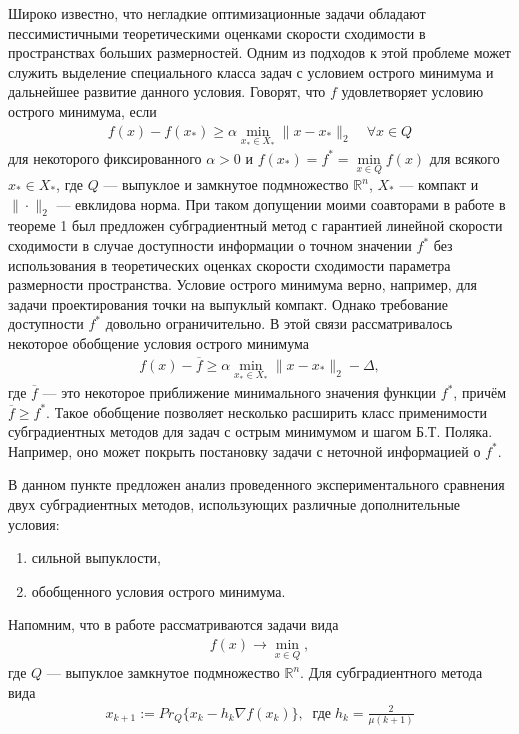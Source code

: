     Широко известно, что негладкие оптимизационные задачи обладают пессимистичными теоретическими оценками скорости сходимости в пространствах больших размерностей. Одним из подходов к этой проблеме может служить выделение специального класса задач с условием острого минимума \cite{6, 1} и дальнейшее развитие данного условия. Говорят, что $f$ удовлетворяет условию острого минимума, если
    \begin{gather}\label{sm}
    f(x) - f(x_*) \geq \alpha \min_{x_* \in X_*} \|x- x_*\|_2 \quad \forall x \in Q
    \end{gather}
    для некоторого фиксированного $\alpha >0$ и $f(x_*) = f^* = \min\limits_{x\in Q} f(x)$ для всякого $x_* \in X_*$, где $Q$ --- выпуклое и замкнутое подмножество $\mathbb{R}^n$, $X_*$ --- компакт и $\|\cdot\|_2$ --- евклидова норма. 
    При таком допущении моими соавторами в работе \cite{sharp22} в теореме 1 был предложен субградиентный метод с гарантией  линейной скорости сходимости в случае доступности информации о точном значении $f^*$ \cite{6} без использования в теоретических оценках скорости сходимости  параметра размерности пространства. Условие острого минимума верно, например, для задачи проектирования точки на выпуклый компакт. Однако требование доступности $f^*$ довольно ограничительно. В этой связи рассматривалось некоторое обобщение условия острого минимума
    \begin{gather}\label{eq_gen_sharp}
    f(x) - \overline{f} \geq \alpha \min_{x_* \in X_*} \|x - x_* \|_2 - \Delta,
    \end{gather}
    где $\overline{f}$  --- это некоторое приближение минимального значения функции $f^*$, причём $\overline{f} \geq f^*$. Такое обобщение позволяет несколько расширить класс применимости субградиентных методов для задач с острым минимумом и шагом Б.Т. Поляка. Например, оно может покрыть постановку задачи с неточной информацией о $f^*$.  

    В данном пункте предложен анализ проведенного экспериментального сравнения двух субградиентных методов, использующих различные дополнительные условия:
    \begin{enumerate}
        \item сильной выпуклости,
        \item обобщенного условия острого минимума.
    \end{enumerate}
    Напомним, что в работе рассматриваются задачи вида
    \begin{gather}\label{min_q}
        f(x)\rightarrow\min_{x\in Q},
    \end{gather}
    где $Q$ --- выпуклое замкнутое подмножество $\mathbb{R}^{n}$. Для субградиентного метода вида
    \begin{gather}\label{orig}
        x_{k+1} := Pr_{Q}\{x_k - h_k \nabla f(x_k) \}, \;\; \textit{где} \; h_k = \frac{2}{\mu (k+1)}
    \end{gather}


